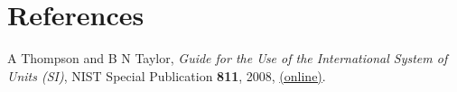 \section{References}

\begingroup
\renewcommand{\section}[2]{}%

\begin{thebibliography}{9}
A Thompson and B N Taylor, \textit{Guide for the Use of the International System of Units (SI)}, NIST Special Publication \textbf{811}, 2008, \href{http://www.nist.gov/pml/pubs/sp811/index.cfm}{(online)}.
\end{thebibliography}

\endgroup